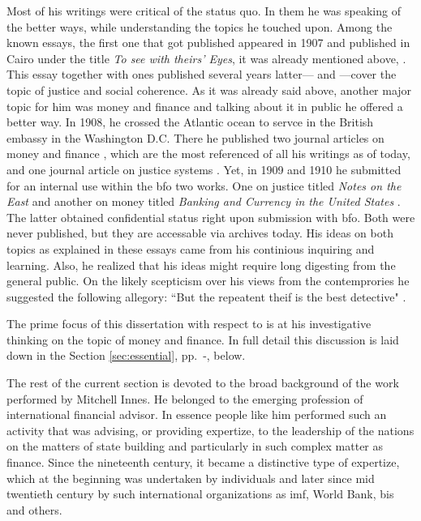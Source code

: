 Most of his writings were critical of the status quo. In them he was speaking of the better ways, while understanding the topics he touched upon. Among the known essays, the first one that got published appeared in 1907 and published in Cairo under the title \textit{To see with theirs' Eyes}, it was already mentioned above, \citep{innes1907}. This essay together with ones published several years latter---\cite{innes1909} and \citep{innes1913_}---cover the topic of justice and social coherence. As it was already said above, another major topic for him was money and finance and talking about it in public he offered a better way. In 1908, he crossed the Atlantic ocean to servce in the British embassy in the Washington D.C. There he published two journal articles on money and finance \citep{innes1913,innes1914}, which are the most referenced of all his writings as of today, and one journal article on justice systems \citep{innes1913_}. Yet, in 1909 and 1910 he submitted for an internal use within the \ac{bfo} two works. One on justice titled \textit{Notes on the East} \citep{innes1909} and another on money titled \textit{Banking and Currency in the United States} \citep{innes1910}. The latter obtained confidential status right upon submission with \ac{bfo}. Both were never published, but they are accessable via archives today. His ideas on both topics as explained in these essays came from his continious inquiring and learning. Also, he realized that his ideas might require long digesting from the general public. On the likely scepticism over his views from the contemprories he suggested the following allegory: ``But the repeatent theif is the best detective" \cite[p.~4]{innes1907}.

The prime focus of this dissertation with respect to \citeauthor{innes1913} is at his investigative thinking on the topic of money and finance. In full detail this discussion is laid down in the Section \ref{sec:essential}, pp.~\pageref{sec:essential}-\pageref{sec:other_creditists}, below. 

The rest of the current section is devoted to the broad background of the work performed by Mitchell Innes. He belonged to the emerging profession of international financial advisor. In essence people like him performed such an activity that was advising, or providing expertize, to the leadership of the nations on the matters of state building and particularly in such complex matter as finance. Since the nineteenth century, it became a distinctive type of expertize, which at the beginning was undertaken by individuals and later since mid twentieth century by such international organizations as \ac{imf}, World Bank, \ac{bis} and others.

